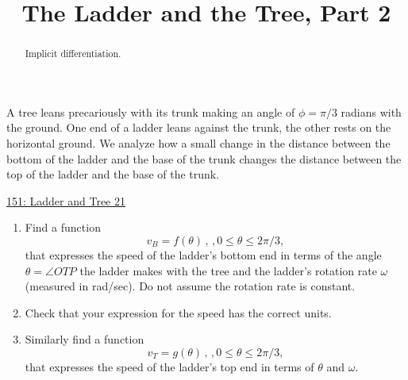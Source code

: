 \documentclass{ximera}
\title{The Ladder and the Tree, Part 2}
\begin{document}
\begin{abstract}
Implicit differentiation.
\end{abstract}
\maketitle

\begin{question} \label{Q43hhbdsfdsfdszz}

A tree leans precariously with its trunk making an angle of $\phi = \pi/3$ radians with the ground. One end of a ladder leans against the trunk, the other rests on the horizontal ground. We analyze how a small change in the distance between the bottom of the ladder and the base of the trunk changes the distance between the top of the ladder and the base of the trunk.


 
\begin{onlineOnly}
   \begin{center}
\end{center}
\end{onlineOnly}

\href{https://www.desmos.com/calculator/bscbpblji1}{151: Ladder and Tree 21}


\begin{enumerate}
\item Find a function
\[
    v_B = f(\theta) \, , \, , 0\leq \theta \leq 2\pi/3 ,
\]
that expresses the speed of the ladder's bottom end in terms of the angle $\theta = \angle OTP$ the ladder makes with the tree and the ladder's rotation rate $\omega$ (measured in rad/sec). Do not assume the rotation rate is constant.

\item Check that your expression for the speed has the correct units.

\item Similarly find a function 
\[
    v_T = g(\theta) \, , \, , 0\leq \theta \leq 2\pi/3 ,
\]
that expresses the speed of the ladder's top end in terms of $\theta$ and $\omega$.


\end{enumerate}
\end{question}
\end{document}
